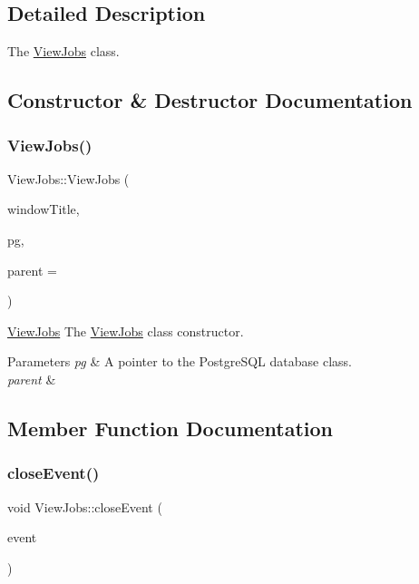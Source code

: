 \subsection{Detailed Description}
The \hyperlink{class_view_jobs}{View\+Jobs} class. 

\subsection{Constructor \& Destructor Documentation}
\mbox{\label{class_view_jobs_ac78f48cc812a0348a233f33dc78a71cc}} 
\subsubsection{\texorpdfstring{View\+Jobs()}{ViewJobs()}}
{\footnotesize\ttfamily View\+Jobs\+::\+View\+Jobs (\begin{DoxyParamCaption}\item[{Q\+String}]{window\+Title,  }\item[{\hyperlink{classpsql}{psql} $\ast$}]{pg,  }\item[{Q\+Widget $\ast$}]{parent = {} }\end{DoxyParamCaption})\hspace{0.3cm}{\ttfamily [explicit]}}



\hyperlink{class_view_jobs}{View\+Jobs} The \hyperlink{class_view_jobs}{View\+Jobs} class constructor. 


\begin{DoxyParams}{Parameters}
{\em pg} & A pointer to the Postgre\+S\+QL database class. \\
\hline
{\em parent} & \\
\hline
\end{DoxyParams}


\subsection{Member Function Documentation}
\mbox{\label{class_view_jobs_a832503ca9eb4e4bf79c2fb48a59141aa}} 
\subsubsection{\texorpdfstring{close\+Event()}{closeEvent()}}
{\footnotesize\ttfamily void View\+Jobs\+::close\+Event (\begin{DoxyParamCaption}\item[{Q\+Close\+Event $\ast$}]{event }\end{DoxyParamCaption})\hspace{0.3cm}{\ttfamily [override]}}



